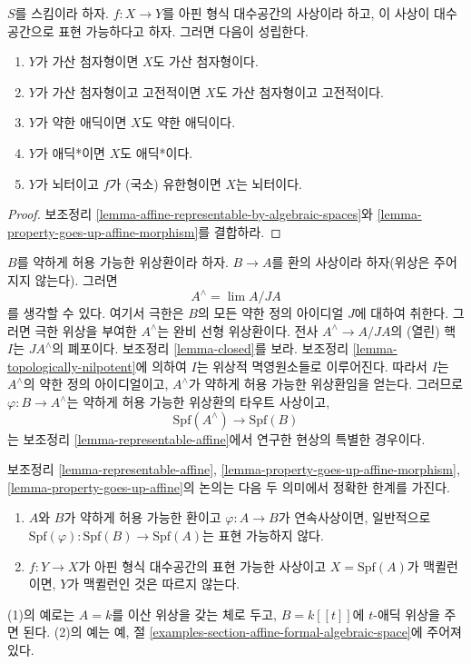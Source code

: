 \begin{lemma}
\label{lemma-property-goes-up-affine}
$S$를 스킴이라 하자. $f : X \to Y$를 아핀 형식 대수공간의
사상이라 하고, 이 사상이 대수공간으로 표현 가능하다고 하자.
그러면 다음이 성립한다.
\begin{enumerate}
\item $Y$가 가산 첨자형이면 $X$도 가산 첨자형이다.
\item $Y$가 가산 첨자형이고 고전적이면 $X$도 가산 첨자형이고
고전적이다.
\item $Y$가 약한 애딕이면 $X$도 약한 애딕이다.
\item $Y$가 애딕*이면 $X$도 애딕*이다.
\item $Y$가 뇌터이고 $f$가 (국소) 유한형이면 $X$는 뇌터이다.
\end{enumerate}
\end{lemma}

\begin{proof}
보조정리 \ref{lemma-affine-representable-by-algebraic-spaces}와
\ref{lemma-property-goes-up-affine-morphism}를 결합하라.
\end{proof}

\begin{example}
\label{example-representable-morphism-from-completion}
$B$를 약하게 허용 가능한 위상환이라 하자. $B \to A$를 환의
사상이라 하자(위상은 주어지지 않는다). 그러면
$$
A^\wedge = \lim A/JA
$$
를 생각할 수 있다. 여기서 극한은 $B$의 모든 약한 정의 아이디얼
$J$에 대하여 취한다. 그러면 극한 위상을 부여한 $A^\wedge$는 완비
선형 위상환이다. 전사 $A^\wedge \to A/JA$의 (열린) 핵 $I$는
$JA^\wedge$의 폐포이다. 보조정리 \ref{lemma-closed}를 보라.
보조정리 \ref{lemma-topologically-nilpotent}에 의하여 $I$는 위상적
멱영원소들로 이루어진다. 따라서 $I$는 $A^\wedge$의 약한 정의
아이디얼이고, $A^\wedge$가 약하게 허용 가능한 위상환임을 얻는다.
그러므로 $\varphi : B \to A^\wedge$는 약하게 허용 가능한 위상환의
타우트 사상이고, %
$$
\text{Spf}(A^\wedge) \longrightarrow \text{Spf}(B)
$$
는 보조정리 \ref{lemma-representable-affine}에서 연구한 현상의
특별한 경우이다.
\end{example}

\begin{remark}[경고]
\label{remark-warning}
보조정리 \ref{lemma-representable-affine},
\ref{lemma-property-goes-up-affine-morphism},
\ref{lemma-property-goes-up-affine}의 논의는 다음 두 의미에서
정확한 한계를 가진다.
\begin{enumerate}
\item $A$와 $B$가 약하게 허용 가능한 환이고
$\varphi : A \to B$가 연속사상이면, 일반적으로
$\text{Spf}(\varphi) : \text{Spf}(B) \to \text{Spf}(A)$는
표현 가능하지 않다.
\item $f : Y \to X$가 아핀 형식 대수공간의 표현 가능한 사상이고
$X = \text{Spf}(A)$가 맥퀼런이면, $Y$가 맥퀼런인 것은 따르지 않는다.
\end{enumerate}
(1)의 예로는 $A = k$를 이산 위상을 갖는 체로 두고,
$B = k[[t]]$에 $t$-애딕 위상을 주면 된다. (2)의 예는 예,
절 \ref{examples-section-affine-formal-algebraic-space}에 주어져 있다.
\end{remark}


